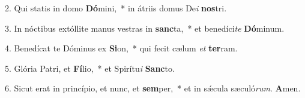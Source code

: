 2. Qui statis in domo \textbf{Dó}mini,~*  in átriis domus De\textit{i} \textbf{nos}tri.\

3. In nóctibus extóllite manus vestras in \textbf{sanc}ta,~*  et benedíci\textit{te} \textbf{Dó}minum.\

4. Benedícat te Dóminus ex \textbf{Si}on,~*  qui fecit cælum \textit{et} \textbf{ter}ram.\

5. Glória Patri, et \textbf{Fí}lio,~*  et Spirítu\textit{i} \textbf{Sanc}to.\

6. Sicut erat in princípio, et nunc, et \textbf{sem}per,~*  et in sǽcula sæculó\textit{rum}. \textbf{A}men.\

